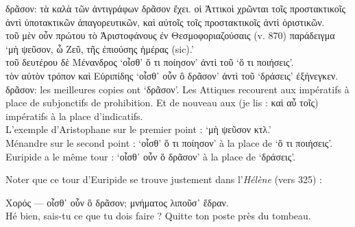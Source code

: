 \documentclass[12pt]{book}%
\newcommand{\italique}[1]{\textit{#1}}%
\newcommand{\citComm}[1]{\begin{quoting}[vskip=0pt] #1 \end{quoting}}%
\newcommand{\francais}[1]{{\policeFr #1}}%
\newcommand{\allemand}[1]{{\policeAll #1}}%
\newenvironment{groupe}{%
\pstart%
\ledgroup%
}{%
\pend %
}%
\begin{document}
\begin{pages}
\begin{Leftside}
\begin{groupe}
{{\citComm{δρᾶσον: τὰ καλὰ τῶν ἀντιγράφων δρᾶσον ἔχει. οἱ Ἀττικοὶ χρῶνται τοῖς προστακτικοῖς ἀντὶ ὑποτακτικῶν ἀπαγορευτικῶν, καὶ αὐτοῖς τοῖς προστακτικοῖς ἀντὶ ὁριστικῶν.\\
τοῦ μὲν οὖν πρώτου τὸ Ἀριστοφάνους ἐν Θεσμοφοριαζούσαις (v. 870) παράδειγμα `μὴ ψεῦσον, ὦ Ζεῦ, τῆς ἐπιούσης ἡμέρας (sic).'\\
τοῦ δευτέρου δὲ Μένανδρος `οἶσθ' ὅ τι ποίησον' ἀντὶ 
τοῦ `ὅ τι ποιήσεις'.\\
τὸν αὐτὸν τρόπον καὶ Εὐριπίδης `οἶσθ᾿ οὖν ὃ δρᾶσον' ἀντὶ τοῦ `δράσεις' ἐξήνεγκεν.\\
δρᾶσον: les meilleures copies ont `δρᾶσον'.
Les Attiques recourent aux impératifs à place de subjonctifs de prohibition. Et de nouveau aux (je lis : καὶ αὖ τοῖς) impératifs à la place d'indicatifs.\\
L'exemple d'Aristophane sur le premier point : `μὴ ψεῦσον κτλ.'\\
Ménandre sur le second point : `οἶσθ' ὅ τι ποίησον' à la place de `ὅ τι ποιήσεις'.\\
Euripide a le même tour : `οἶσθ᾿ οὖν ὃ δρᾶσον' à la place de `δράσεις'.}%
Noter que ce tour d'Euripide se trouve justement dans l'\italique{Hélène} (vers 325) :%
\citComm{Χορός --- οἶσθ᾽ οὖν ὃ δρᾶσον; μνήματος λιποῦσ᾽ ἕδραν.\\
\francais{Hé bien, sais-tu ce que tu dois faire ? Quitte ton poste près du tombeau.}}%
}}
\end{groupe}
\end{Leftside}
\end{pages}
\end{document}

